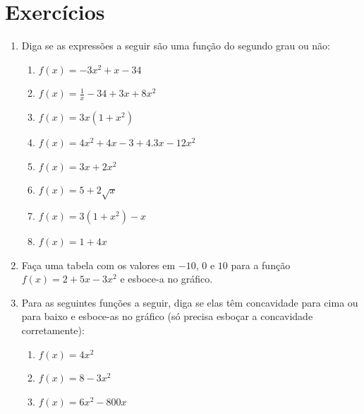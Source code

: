 \documentclass[11pt]{article}
\begin{document}
\section{Exercícios}
\begin{enumerate}
	\item Diga se as expressões a seguir são uma função do segundo grau 
		ou não:
	\begin{enumerate}
		\item $f(x) = -3x^2 + x - 34$
		\item $f(x) = \frac{1}{x} - 34 + 3x + 8x^2$
		\item $f(x) = 3x(1 + x^2)$
		\item $f(x) = 4x^2 + 4x - 3 + 4.3x - 12x^2$
		\item $f(x) = 3x + 2x^2$
		\item $f(x) = 5 + 2\sqrt{x}$
		\item $f(x) = 3(1 + x^2) - x$
		\item $f(x) = 1 + 4x$
	\end{enumerate}

	\item Faça uma tabela com os valores em $-10$, $0$ e $10$ para a 
		função $f(x) = 2 + 5x - 3x^2$ e esboce-a no gráfico.

	\item Para as seguintes funções a seguir, diga se elas têm concavidade 
		para cima ou para baixo e esboce-as no gráfico 
		(só precisa esboçar a concavidade corretamente):
	\begin{enumerate}
		\item $f(x) = 4x^2$
		\item $f(x) = 8 - 3x^2$
		\item $f(x) = 6x^2 - 800x$
	\end{enumerate}
\end{enumerate}

\newpage
\end{document}
